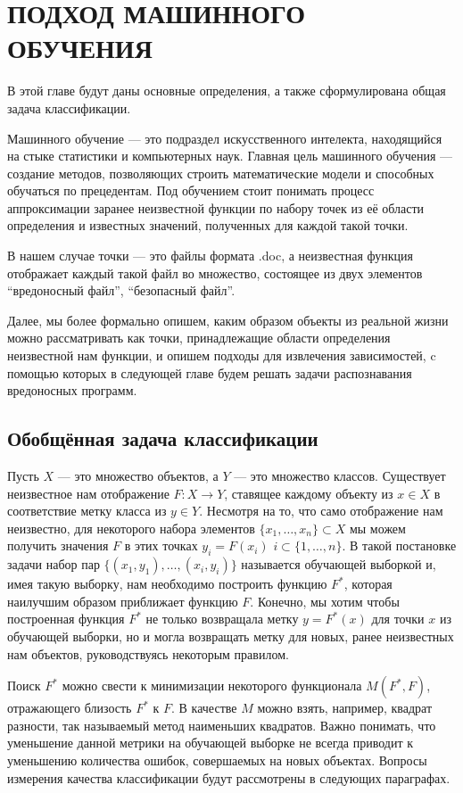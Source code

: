 \chapter{ПОДХОД МАШИННОГО ОБУЧЕНИЯ}

В этой главе будут даны основные определения, а также  сформулирована общая задача классификации.

Машинного обучение — это подраздел искусственного интелекта, находящийся на стыке статистики и компьютерных наук. Главная цель машинного обучения — создание методов, позволяющих строить математические модели и способных обучаться по прецедентам. Под обучением стоит понимать процесс аппроксимации заранее неизвестной функции по набору точек из её области определения и известных значений, полученных для каждой такой точки.

В нашем случае точки — это файлы формата .doc, а неизвестная функция отображает каждый такой файл во множество, состоящее из двух элементов {“вредоносный файл”, “безопасный файл”}.

Далее, мы более формально опишем, каким образом объекты  из реальной жизни можно рассматривать как точки, принадлежащие области определения неизвестной нам функции, и опишем подходы для извлечения зависимостей, c помощью которых в следующей главе будем решать задачи распознавания вредоносных программ.

\section{Обобщённая задача классификации}

Пусть $X$ — это множество объектов, а $Y$ — это множество классов.
Существует неизвестное нам отображение $F : X \to Y$, ставящее каждому объекту из $x \in X$ в соответствие метку класса из $y \in Y$.
Несмотря на то, что само отображение нам неизвестно, для некоторого набора элементов $\{ x_1, \dots , x_n \} \subset X$ мы можем получить значения $F$ в этих точках  $y_i = F(x_i)$ $i \subset \{ 1, \dots, n \}$.
В такой постановке задачи набор пар $\{ (x_1, y_1), \dots, (x_i, y_i) \}$ называется обучающей выборкой и, имея такую выборку, нам необходимо построить функцию $F^*$, которая наилучшим образом приближает функцию $F$.
Конечно, мы хотим чтобы построенная функция $F^*$ не только возвращала метку $y = F^*(x)$ для точки $x$ из обучающей выборки, но и могла возвращать метку для новых, ранее неизвестных нам объектов, руководствуясь некоторым правилом.

Поиск $F^*$ можно свести к минимизации некоторого функционала $M(F^*, F)$, отражающего близость $F^*$ к $F$. В качестве $M$ можно взять, например, квадрат разности, так называемый метод наименьших квадратов. Важно понимать, что уменьшение данной метрики на обучающей выборке не всегда приводит к уменьшению количества ошибок, совершаемых на новых объектах. Вопросы измерения качества классификации будут рассмотрены в следующих параграфах.

